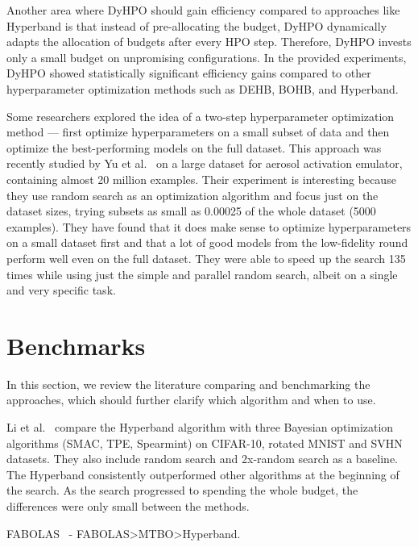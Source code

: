 Another area where DyHPO should gain efficiency compared to approaches like Hyperband is that instead of pre-allocating the budget, DyHPO dynamically adapts the allocation of budgets after every HPO step. Therefore, DyHPO invests only a small budget on unpromising configurations. In the provided experiments, DyHPO showed statistically significant efficiency gains compared to other hyperparameter optimization methods such as DEHB, BOHB, and Hyperband.



Some researchers explored the idea of a two-step hyperparameter optimization method --- first optimize hyperparameters on a small subset of data and then optimize the best-performing models on the full dataset. This approach was recently studied by Yu et al.~\cite{yu2024two} on a large dataset for aerosol activation emulator, containing almost 20 million examples. Their experiment is interesting because they use random search as an optimization algorithm and focus just on the dataset sizes, trying subsets as small as 0.00025 of the whole dataset (5000 examples). They have found that it does make sense to optimize hyperparameters on a small dataset first and that a lot of good models from the low-fidelity round perform well even on the full dataset. They were able to speed up the search 135 times while using just the simple and parallel random search, albeit on a single and very specific task.



\section{Benchmarks}
In this section, we review the literature comparing and benchmarking the approaches, which should further clarify which algorithm and when to use.


Li et al.~\cite{li2018hyperband} compare the Hyperband algorithm with three Bayesian optimization algorithms (SMAC, TPE, Spearmint) on CIFAR-10, rotated MNIST and SVHN datasets. They also include random search and 2x-random search as a baseline. The Hyperband consistently outperformed other algorithms at the beginning of the search. As the search progressed to spending the whole budget, the differences were only small between the methods.

FABOLAS~\cite{klein2017fast} - FABOLAS>MTBO>Hyperband.